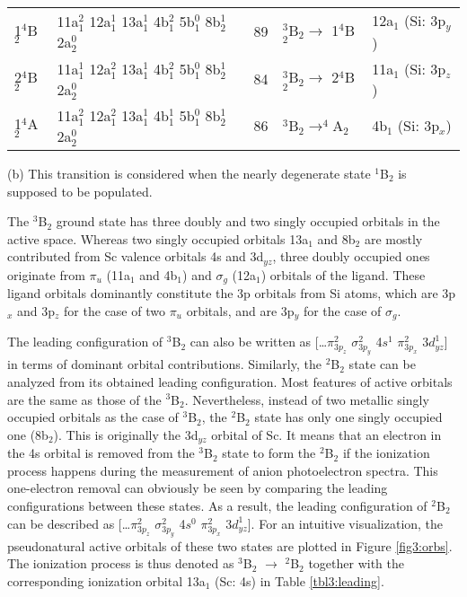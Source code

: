 \begin{refsection}
\begin{table}[]
\begin{threeparttable}
\begin{tabular}{@{}llcll@{}}
1$^4$B$_2$ & 11a$_1^2$ 12a$_1^1$ 13a$_1^1$ 4b$_1^2$ 5b$_1^0$ 8b$_2^1$ 2a$_2^0$  & 89  & $^3$B$_2 \longrightarrow$ 1$^4$B$_2$ & 12a$_1$ (Si: 3p$_y$) \\
2$^4$B$_2$ & 11a$_1^1$ 12a$_1^2$ 13a$_1^1$ 4b$_1^2$ 5b$_1^0$ 8b$_2^1$ 2a$_2^0$  & 84  & $^3$B$_2 \longrightarrow$ 2$^4$B$_2$ & 11a$_1$ (Si: 3p$_z$) \\
1$^4$A$_2$ & 11a$_1^2$ 12a$_1^2$ 13a$_1^1$ 4b$_1^1$ 5b$_1^0$ 8b$_2^1$ 2a$_2^0$  & 86  & $^3$B$_2 \longrightarrow    ^4$A$_2$ & 4b$_1$  (Si: 3p$_x$) \\ \bottomrule
	\end{tabular}
	\begin{tablenotes}
		\item[(b)] This transition is considered when the nearly degenerate state $^1$B$_2$ is supposed to be populated.
	\end{tablenotes}
	\end{threeparttable}
\end{table}





The $^3$B$_2$ ground state has three doubly and two singly occupied orbitals in the active space. Whereas two singly occupied orbitals 13a$_1$ and 8b$_2$ are mostly contributed from Sc valence orbitals 4s and 3d$_{yz}$, three doubly occupied ones originate from $\pi_u$ (11a$_1$ and 4b$_1$) and $\sigma_g$ (12a$_1$) orbitals of the  ligand. These ligand orbitals dominantly constitute the 3p orbitals from Si atoms, which are 3p$_x$ and 3p$_z$ for the case of two $\pi_u$ orbitals, and are 3p$_y$ for the case of $\sigma_g$. 




The leading configuration of $^3$B$_2$ can also be written as [\ldots $\pi^2_{3p_z}$ $\sigma^2_{3p_y}$ 4$s^1$ $\pi^2_{3p_x}$ 3$d^1_{yz}$] in terms of dominant orbital contributions. Similarly, the $^2$B$_2$ state can be analyzed from its obtained leading configuration. Most features of active orbitals are the same as those of the $^3$B$_2$. Nevertheless, instead of two metallic singly occupied orbitals as the case of $^3$B$_2$, the $^2$B$_2$ state has only one singly occupied one (8b$_2$). This is originally the 3d$_{yz}$ orbital of Sc. It means that an electron in the 4s orbital is removed from the $^3$B$_2$ state to form the $^2$B$_2$ if the ionization process happens during the measurement of anion photoelectron spectra. This one-electron removal can obviously be seen by comparing the leading configurations between these states. As a result, the leading configuration of $^2$B$_2$ can be described as [\ldots $\pi^2_{3p_z}$ $\sigma^2_{3p_y}$ 4$s^0$ $\pi^2_{3p_x}$ 3$d^1_{yz}$]. For an intuitive visualization, the pseudonatural active orbitals of these two states are plotted in Figure \ref{fig3:orbs}. The ionization process is thus denoted as $^3$B$_2$ $\longrightarrow$ $^2$B$_2$ together with the corresponding ionization orbital 13a$_1$ (Sc: 4s) in Table \ref{tbl3:leading}.



\end{refsection}
